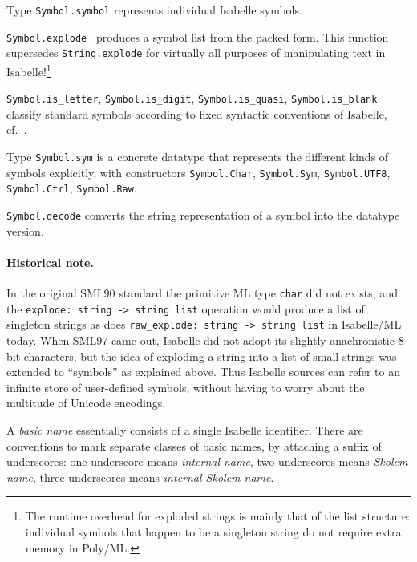 \begin{isabellebody}
\begin{isamarkuptext}
  \begin{description}

  \item Type \verb|Symbol.symbol| represents individual Isabelle
  symbols.

  \item \verb|Symbol.explode|~ produces a symbol list
  from the packed form.  This function supersedes \verb|String.explode| for virtually all purposes of manipulating text in
  Isabelle!\footnote{The runtime overhead for exploded strings is
  mainly that of the list structure: individual symbols that happen to
  be a singleton string do not require extra memory in Poly/ML.}

  \item \verb|Symbol.is_letter|, \verb|Symbol.is_digit|, \verb|Symbol.is_quasi|, \verb|Symbol.is_blank| classify standard
  symbols according to fixed syntactic conventions of Isabelle, cf.\
  \cite{isabelle-isar-ref}.

  \item Type \verb|Symbol.sym| is a concrete datatype that
  represents the different kinds of symbols explicitly, with
  constructors \verb|Symbol.Char|, \verb|Symbol.Sym|, \verb|Symbol.UTF8|, \verb|Symbol.Ctrl|, \verb|Symbol.Raw|.

  \item \verb|Symbol.decode| converts the string representation of a
  symbol into the datatype version.

  \end{description}

  \paragraph{Historical note.} In the original SML90 standard the
  primitive ML type \verb|char| did not exists, and the \verb|explode: string -> string list| operation would produce a list of
  singleton strings as does \verb|raw_explode: string -> string list|
  in Isabelle/ML today.  When SML97 came out, Isabelle did not adopt
  its slightly anachronistic 8-bit characters, but the idea of
  exploding a string into a list of small strings was extended to
  ``symbols'' as explained above.  Thus Isabelle sources can refer to
  an infinite store of user-defined symbols, without having to worry
  about the multitude of Unicode encodings.%
\end{isamarkuptext}%
\isamarkuptrue%
%
\endisatagmlref
{\isafoldmlref}%
%
\isadelimmlref
%
\endisadelimmlref
%
\isamarkuptrue%
%
\begin{isamarkuptext}%
A \emph{basic name} essentially consists of a single Isabelle
  identifier.  There are conventions to mark separate classes of basic
  names, by attaching a suffix of underscores: one underscore means
  \emph{internal name}, two underscores means \emph{Skolem name},
  three underscores means \emph{internal Skolem name}.


\end{isamarkuptext}
\end{isabellebody}

